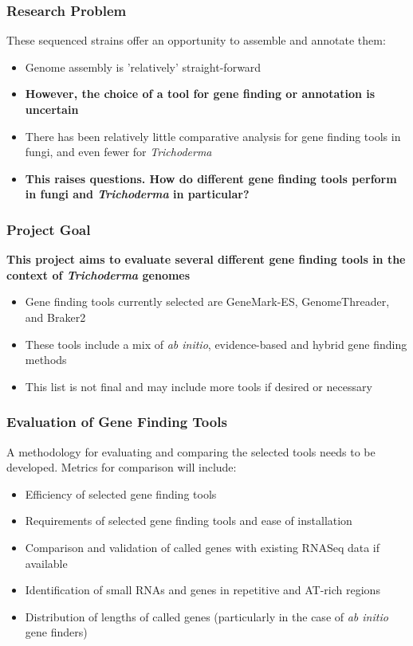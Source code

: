 \documentclass{beamer}
\begin{document}
\begin{frame}
  \frametitle{Research Problem} These sequenced strains offer an
  opportunity to assemble and annotate them:
  \begin{itemize}
  \item Genome assembly is 'relatively' straight-forward
  \item \textbf{However, the choice of a tool for gene finding or
    annotation is uncertain}
  \item There has been relatively little comparative analysis for gene
    finding tools in fungi, and even fewer for \textit{Trichoderma}
  \item \textbf{This raises questions. How do different gene finding
    tools perform in fungi and \textit{Trichoderma} in particular?}
  \end{itemize}
\end{frame}

\begin{frame}
  \frametitle{Project Goal} \textbf{This project aims to evaluate
    several different gene finding tools in the context of
    \textit{Trichoderma} genomes}
  \begin{itemize}
    \item Gene finding tools currently selected are GeneMark-ES,
      GenomeThreader, and Braker2
    \item These tools include a mix of \textit{ab initio},
      evidence-based and hybrid gene finding methods
    \item This list is not final and may include more tools if
      desired or necessary
  \end{itemize}
\end{frame}

\begin{frame}
  \frametitle{Evaluation of Gene Finding Tools} A methodology for
  evaluating and comparing the selected tools needs to be
  developed. Metrics for comparison will include:
  \begin{itemize}
  \item Efficiency of selected gene finding tools
  \item Requirements of selected gene finding tools and ease of
    installation
  \item Comparison and validation of called genes with existing RNASeq data if
    available
  \item Identification of small RNAs and genes in repetitive and
    AT-rich regions
  \item Distribution of lengths of called genes (particularly in the
    case of \textit{ab initio} gene finders)
  \end{itemize}
\end{frame}
\end{document}
